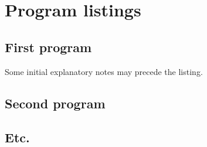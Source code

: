 \chapter{Program listings}

\section{First program}

Some initial explanatory notes may precede the listing.

\section{Second program}

\section{Etc.}